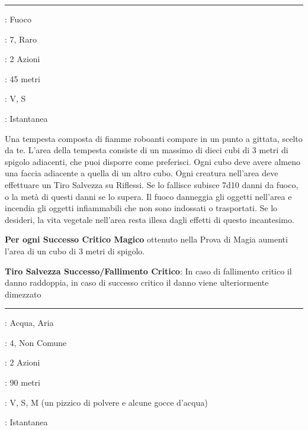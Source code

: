 \begin{multicols}{2}

\smallskip\noindent\rule{\linewidth}{2pt} \hypertarget{Tempesta di Fuoco}{}\medskip{}
\noindent
\begin{description}[noitemsep, topsep=0pt, parsep=0pt, partopsep=0pt, leftmargin=0cm, labelwidth=2.8cm]
	\item[\textbf{Lista di Magia}]: Fuoco
	\item[\textbf{Livello}]: 7, Raro
	\item[\textbf{T. di Lancio}]: 2 Azioni
	\item[\textbf{Gittata}]: 45 metri
	\item[\textbf{Componenti}]: V, S
	\item[\textbf{Durata}]: Istantanea
\end{description}

Una tempesta composta di fiamme roboanti compare in un punto a gittata, scelto da te. L'area della tempesta consiste di un massimo di dieci cubi di 3 metri di spigolo adiacenti, che puoi disporre come preferisci. Ogni cubo deve avere almeno una faccia adiacente a quella di un altro cubo. Ogni creatura nell'area deve effettuare un Tiro Salvezza su Riflessi. Se lo fallisce subisce 7d10 danni da fuoco, o la metà di questi danni se lo supera. Il fuoco danneggia gli oggetti nell'area e incendia gli oggetti infiammabili che non sono indossati o trasportati. Se lo desideri, la vita vegetale nell'area resta illesa dagli effetti di questo incantesimo.

\textbf{Per ogni Successo Critico Magico} ottenuto nella Prova di Magia aumenti l'area di un cubo di 3 metri di spigolo.

\textbf{Tiro Salvezza Successo/Fallimento Critico}: In caso di fallimento critico il danno raddoppia, in caso di successo critico il danno viene ulteriormente dimezzato

\smallskip\noindent\rule{\linewidth}{2pt} \hypertarget{Tempesta di Ghiaccio}{}\medskip{}
\noindent
\begin{description}[noitemsep, topsep=0pt, parsep=0pt, partopsep=0pt, leftmargin=0cm, labelwidth=2.8cm]
	\item[\textbf{Lista di Magia}]: Acqua, Aria
	\item[\textbf{Livello}]: 4, Non Comune
	\item[\textbf{T. di Lancio}]: 2 Azioni
	\item[\textbf{Gittata}]: 90 metri
	\item[\textbf{Componenti}]: V, S, M (un pizzico di polvere e alcune gocce d'acqua)
	\item[\textbf{Durata}]: Istantanea
\end{description}


\end{multicols}
